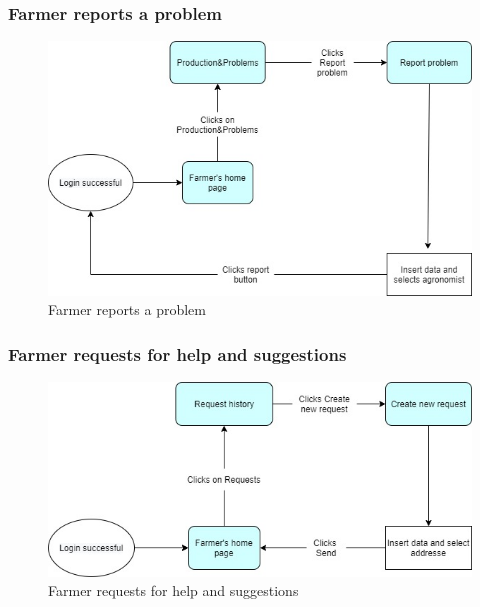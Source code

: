 \documentclass{article}
\begin{document}
        \subsubsection{Farmer reports a problem}
            \begin{figure} [h]
                \centering
                \includegraphics[width=1\textwidth]{images/UserInterfaces/MapsFunctionalities/5. FarmerReportAProblem.jpg}
                \caption{\label{fig:FarmerReportsProblem}Farmer reports a problem}
            \end{figure}
    
        \newpage
        
        
        \subsubsection{Farmer requests for help and suggestions}
            \begin{figure} [h]
                \centering
                \includegraphics[width=1\textwidth]{images/UserInterfaces/MapsFunctionalities/6. FarmerRequestsHelpAndSuggestions.jpg}
                \caption{\label{fig:FarmerRequestsHelp}Farmer requests for help and suggestions}
            \end{figure}
    
\end{document}
